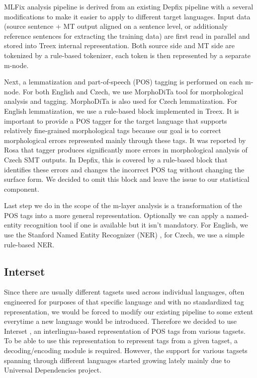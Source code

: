 MLFix analysis pipeline is derived from an existing Depfix pipeline
with a several modifications to make it easier to apply to different
target languages. Input data (source sentence + MT output aligned on a sentence level,
or additionaly reference sentences for extracting the training data)
are first read in parallel and stored into Treex internal representation.
Both source side and MT side are tokenized by a rule-based tokenizer, each token is then
represented by a separate m-node.

Next, a lemmatization and part-of-speech (POS) tagging is performed on each m-node.
For both English and Czech, we use MorphoDiTa \citep{strakova14:morphodita}
tool for morphological analysis and tagging. MorphoDiTa is also used for Czech lemmatization.
For English lemmatization, we use a rule-based block implemented in Treex.
It is important to provide a POS tagger for the target language that supports
relatively fine-grained morphological tags because our goal is to correct morphological
errors represented mainly through these tags.
It was reported by Rosa that tagger produces significantly more
errors in morphological analysis of Czech SMT outputs. In Depfix, this is covered
by a rule-based block that identifies these errors and changes the incorrect POS tag without
changing the surface form. We decided to omit this block and leave the issue to our statistical
component.

Last step we do in the scope of the m-layer analysis is a transformation of the POS tags into
a more general representation. Optionally we can apply a named-entity recognition
tool if one is available but it isn't mandatory. For English, we use the Stanford
Named Entity Recognizer (NER) \citep{Finkel:2005:INI:1219840.1219885},
for Czech, we use a simple rule-based NER. 

\subsection{Interset}

Since there are usually different tagsets used across individual languages,
often engineered for purposes of that specific language and with no standardized
tag representation,
we would be forced to modify our existing pipeline to some extent everytime
a new language would be introduced.
Therefore we decided to use Interset \citep{biblio:ZeReusableTagset2008}, an interlingua-based
representation of POS tags from various tagsets. To be able to use this
representation to represent tags from a given tagset, a decoding/encoding
module is required. However, the support for various tagsets spanning
through different languages started growing lately mainly due to Universal Dependencies \citep{universal-dep:2016} project.

